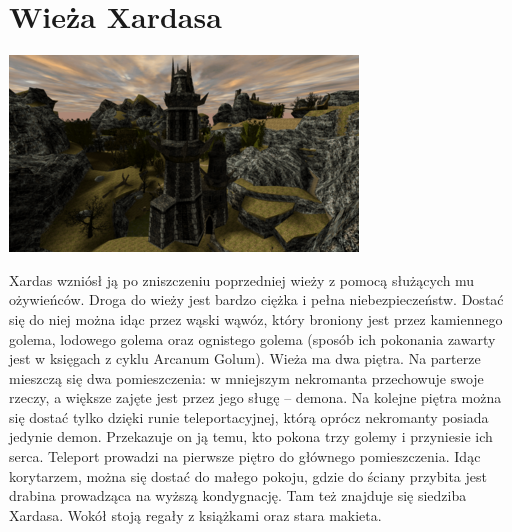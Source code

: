 \documentclass[11pt,polish, openany]{book}
\begin{document}
\section{Wieża Xardasa}
\begin{center}
 \includegraphics[scale=1.0]{wiezaxardasa.png}
\end{center}
Xardas wzniósł ją po zniszczeniu poprzedniej wieży z pomocą służących mu ożywieńców. Droga do wieży jest bardzo ciężka i pełna niebezpieczeństw. Dostać się do niej można idąc przez wąski wąwóz, który broniony jest przez kamiennego golema, lodowego golema oraz ognistego golema (sposób ich pokonania zawarty jest w księgach z cyklu Arcanum Golum). Wieża ma dwa piętra. Na parterze mieszczą się dwa pomieszczenia: w mniejszym nekromanta przechowuje swoje rzeczy, a większe zajęte jest przez jego sługę – demona. Na kolejne piętra można się dostać tylko dzięki runie teleportacyjnej, którą oprócz nekromanty posiada jedynie demon. Przekazuje on ją temu, kto pokona trzy golemy i przyniesie ich serca. Teleport prowadzi na pierwsze piętro do głównego pomieszczenia. Idąc korytarzem, można się dostać do małego pokoju, gdzie do ściany przybita jest drabina prowadząca na wyższą kondygnację. Tam też znajduje się siedziba Xardasa. Wokół stoją regały z książkami oraz stara makieta.
\end{document}
